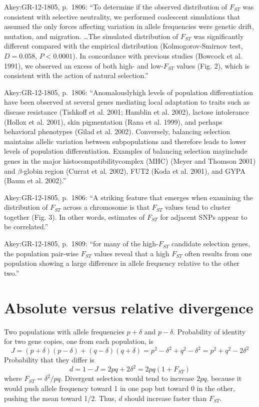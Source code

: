 \documentclass[11pt]{article}
\begin{document}
Akey:GR-12-1805, p.~1806: ``To determine if the observed distribution
of $F_{ST}$ was consistent with selective neutrality, we performed
coalescent simulations that assumed the only forces affecting
variation in allele frequencies were genetic drift, mutation, and
migration. \ldots The simulated distribution of $F_{ST}$ was
significantly different compared with the empirical distribution
(Kolmogorov-Smirnov test, $D = 0.058$, $P < 0.0001$). In concordance
with previous studies (Bowcock et al. 1991), we observed an excess of
both high- and low-$F_{ST}$ values (Fig. 2), which is consistent with
the action of natural selection.''

Akey:GR-12-1805, p.~1806: ``Anomalouslyhigh levels of population
differentiation have been observed at several genes mediating local
adaptation to traits such as disease resistance (Tishkoff et al. 2001;
Hamblin et al. 2002), lactose intolerance (Hollox et al. 2001), skin
pigmentation (Rana et al. 1999), and perhaps behavioral phenotypes
(Gilad et al. 2002). Conversely, balancing selection maintains allelic
variation between subpopulations and therefore leads to lower levels
of population differentiation. Examples of balancing selection
mayinclude genes in the major histocompatibilitycomplex (MHC) (Meyer
and Thomson 2001) and $\beta$-globin region (Currat et al. 2002), FUT2
(Koda et al. 2001), and GYPA (Baum et al. 2002).''

Akey:GR-12-1805, p.~1806: ``A striking feature that emerges when
examining the distribution of $F_{ST}$ across a chromosome is that
$F_{ST}$ values tend to cluster together (Fig. 3). In other words,
estimates of $F_{ST}$ for adjacent SNPs appear to be correlated.''

Akey:GR-12-1805, p.~1809: ``for many of the high-$F_{ST}$ candidate
selection genes, the population pair-wise $F_{ST}$ values reveal that
a high $F_{ST}$ often results from one population showing a large
difference in allele frequency relative to the other two.''

\section{Absolute versus relative divergence}

Two populations with allele frequencies $p+\delta$ and
$p-\delta$. Probability of identity for two gene copies, one from each
population, is
\[
J = (p+\delta)(p-\delta) + (q-\delta)(q+\delta)
= p^2-\delta^2 + q^2 - \delta^2 = p^2 + q^2 - 2\delta^2
\]
Probability that they differ is
\[
d = 1-J = 2pq + 2\delta^2 = 2pq(1+F_{ST})
\]
where $F_{ST} = \delta^2/pq$. Divergent selection would tend to
increase $2pq$, because it would push allele frequency toward 1 in one
pop but toward 0 in the other, pushing the mean toward 1/2. Thus, $d$
should increase faster than $F_{ST}$.

\printbibliography
\end{document}
